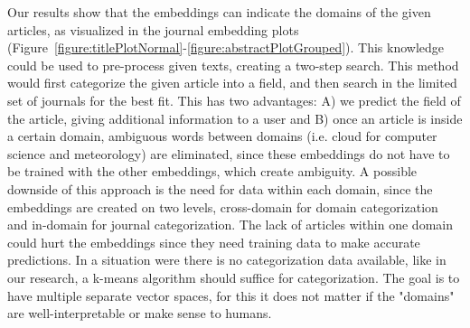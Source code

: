 \documentclass[../../Thesis.tex]{subfiles}
\begin{document}
Our results show that the embeddings can indicate the domains of the given articles, as visualized in the journal embedding plots (Figure~\ref{figure:titlePlotNormal}-\ref{figure:abstractPlotGrouped}). This knowledge could be used to pre-process given texts, creating a two-step search. This method would first categorize the given article into a field, and then search in the limited set of journals for the best fit. This has two advantages: A) we predict the field of the article, giving additional information to a user and B) once an article is inside a certain domain, ambiguous words between domains (i.e. cloud for computer science and meteorology) are eliminated, since these embeddings do not have to be trained with the other embeddings, which create ambiguity. A possible downside of this approach is the need for data within each domain, since the embeddings are created on two levels, cross-domain for domain categorization and in-domain for journal categorization. The lack of articles within one domain could hurt the embeddings since they need training data to make accurate predictions. In a situation were there is no categorization data available, like in our research, a k-means algorithm should suffice for categorization. The goal is to have multiple separate vector spaces, for this it does not matter if the "domains" are well-interpretable or make sense to humans.
\end{document}
